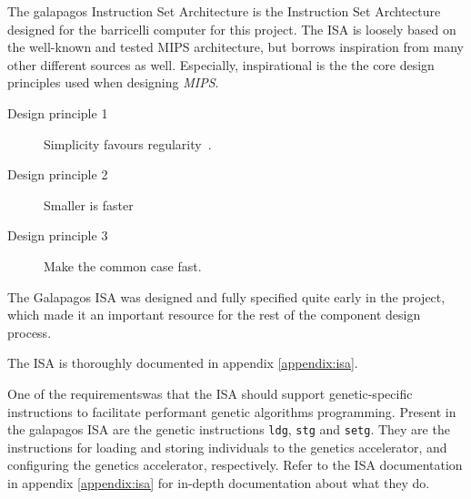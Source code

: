 The \Gls{galapagos} Instruction Set Architecture is the Instruction Set Archtecture designed for the \Gls{barricelli} computer for this project. The ISA is loosely based on the well-known and tested MIPS architecture\cn, but borrows inspiration from many other different sources as well. Especially, inspirational is the the core design principles used when designing \emph{MIPS}.

\begin{description}
  \item[Design principle 1] Simplicity favours regularity~\cite[p.~79]{compOrgDes}. 
  \item[Design principle 2] Smaller is faster ~\cite[p.~81]{compOrgDes}
  \item[Design principle 3] Make the common case fast.~\cite[p.~86]{compOrgDes}
\end{description}










The Galapagos ISA was designed and fully specified quite early in the project, which made it an important resource for the rest of the component design process.

The ISA is thoroughly documented in appendix \vref{appendix:isa}.

One of the requirements\cn was that the ISA should support genetic-specific instructions to facilitate performant genetic algorithms programming.
Present in the \Gls{galapagos} ISA are the genetic instructions \texttt{ldg}, \texttt{stg} and \texttt{setg}.
They are the instructions for loading and storing \glspl{individual} to the genetics accelerator, and configuring the genetics accelerator, respectively.
Refer to the ISA documentation in appendix \vref{appendix:isa} for in-depth documentation about what they do.

